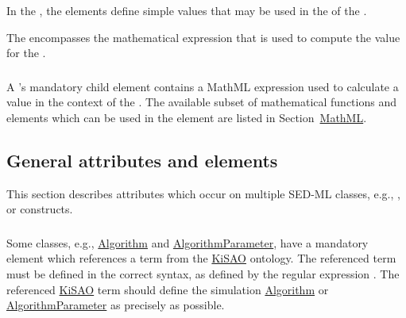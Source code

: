 \begin{blockChanged}
In the \ListOfParameters, the \Parameter elements define simple values that may be used in the \Math of the \Calculation.

The \Math encompasses the mathematical expression that is used to compute the value for the \Calculation.

\subsubsection{}
\label{sec:math}
A \Calculation's mandatory child element  contains a MathML expression used to calculate a value in the context of the \Calculation.  The available subset of mathematical functions and elements which can be used in the \Math element are listed in Section~\hyperref[sec:mathML]{MathML}.


\subsection{General attributes and elements}
This section describes attributes which occur on multiple SED-ML classes, e.g., \kisaoID, or \hyperref[class:listOf]{} constructs.
\label{sec:generalAttributes}

\end{blockChanged}
\subsubsection{}
\label{sec:kisaoid}
Some classes, e.g., \hyperref[class:algorithm]{Algorithm} and \hyperref[class:algorithmParameter]{AlgorithmParameter}, have a mandatory element   which references a term from the \hyperref[sec:kisao]{KiSAO} ontology. The referenced term must be defined in the correct syntax, as defined by the regular expression . The referenced \hyperref[sec:kisao]{KiSAO} term  should define the simulation \hyperref[class:algorithm]{Algorithm} or \hyperref[class:algorithmParameter]{AlgorithmParameter} as precisely as possible.  


